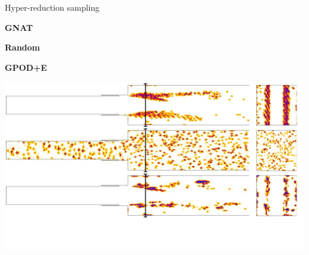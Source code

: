 \documentclass[]{beamer}
\begin{document}
\begin{frame}{Hyper-reduction sampling}
	\begin{minipage}{0.13\linewidth}
		\footnotesize
		\vspace{1.2em}
		\textbf{GNAT}
		\normalsize

		\vspace{3em}

		\footnotesize
		\textbf{Random}

		\vspace{3.7em}

		\footnotesize
		\textbf{GPOD+E}

		\vspace{4em}
	\end{minipage}\hfill
	\begin{minipage}{0.8\linewidth}%
		\includegraphics[width=0.99\linewidth]{theory/iBlanks.jpg}
	\end{minipage}
\end{frame}
\end{document}
